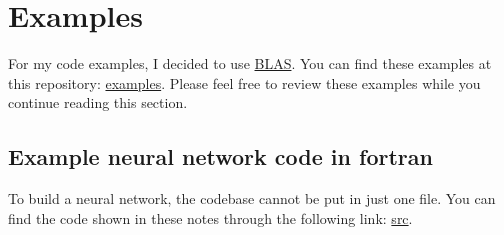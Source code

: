 \section{Examples}
For my code examples, I decided to use \href{https://www.netlib.org/blas/}{BLAS}. You can find these examples
at this repository: \href{https://github.com/alecksandr26/fortran-ml/tree/main/examples}{examples}. Please
feel free to review these examples while you continue reading this section.

\subsection{Example neural network code in fortran}
To build a neural network, the codebase cannot be put in just one file. You can find the code shown in these
notes through the following link:
\href{https://github.com/alecksandr26/fortran-ml/tree/main/src}{src}.




